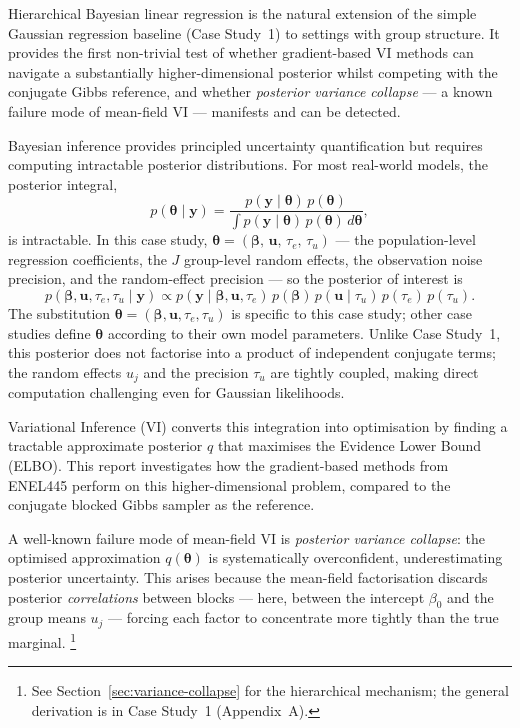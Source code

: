 \documentclass[11pt,a4paper]{article}
\begin{document}
Hierarchical Bayesian linear regression is the natural extension of the simple
Gaussian regression baseline (Case Study~1) to settings with group structure.
It provides the first non-trivial test of whether gradient-based VI methods can
navigate a substantially higher-dimensional posterior whilst competing with the conjugate
Gibbs reference, and whether \emph{posterior variance collapse} --- a known failure
mode of mean-field VI --- manifests and can be detected.

Bayesian inference provides principled uncertainty quantification but requires computing
intractable posterior distributions. For most real-world models, the posterior integral,
\begin{equation*}
    p(\bm{\theta} \mid \bm{y}) = \frac{p(\bm{y} \mid \bm{\theta})\,p(\bm{\theta})}
    {\displaystyle\int p(\bm{y} \mid \bm{\theta})\,p(\bm{\theta})\, d\bm{\theta}},
\end{equation*}
is intractable.
In this case study,
$\bm{\theta} = (\bm{\beta},\,\mathbf{u},\,\tau_e,\,\tau_u)$
--- the population-level regression coefficients, the $J$ group-level random effects,
the observation noise precision, and the random-effect precision --- so the posterior
of interest is
\begin{equation*}
    p(\bm{\beta},\mathbf{u},\tau_e,\tau_u \mid \mathbf{y})
    \propto p(\mathbf{y}\mid\bm{\beta},\mathbf{u},\tau_e)\,
             p(\bm{\beta})\,p(\mathbf{u}\mid\tau_u)\,
             p(\tau_e)\,p(\tau_u).
\end{equation*}
The substitution $\bm{\theta} = (\bm{\beta},\mathbf{u},\tau_e,\tau_u)$ is specific to
this case study; other case studies define $\bm{\theta}$ according to their own model
parameters.
Unlike Case Study~1, this posterior does not factorise into a product of independent
conjugate terms; the random effects $u_j$ and the precision $\tau_u$ are tightly coupled,
making direct computation challenging even for Gaussian likelihoods.

Variational Inference (VI) converts this integration into optimisation by finding
a tractable approximate posterior $q$ that maximises the Evidence Lower Bound (ELBO).
This report investigates how the gradient-based methods from ENEL445 perform on this
higher-dimensional problem, compared to the conjugate blocked Gibbs sampler as the
reference.

A well-known failure mode of mean-field VI is \emph{posterior variance collapse}:
the optimised approximation $q(\bm{\theta})$ is systematically overconfident,
underestimating posterior uncertainty.
This arises because the mean-field factorisation discards posterior \emph{correlations}
between blocks --- here, between the intercept $\beta_0$ and the group means $u_j$
--- forcing each factor to concentrate more tightly than the true marginal.%
\footnote{See Section~\ref{sec:variance-collapse} for the hierarchical mechanism;
the general derivation is in Case Study~1 (Appendix~A).}
\end{document}
